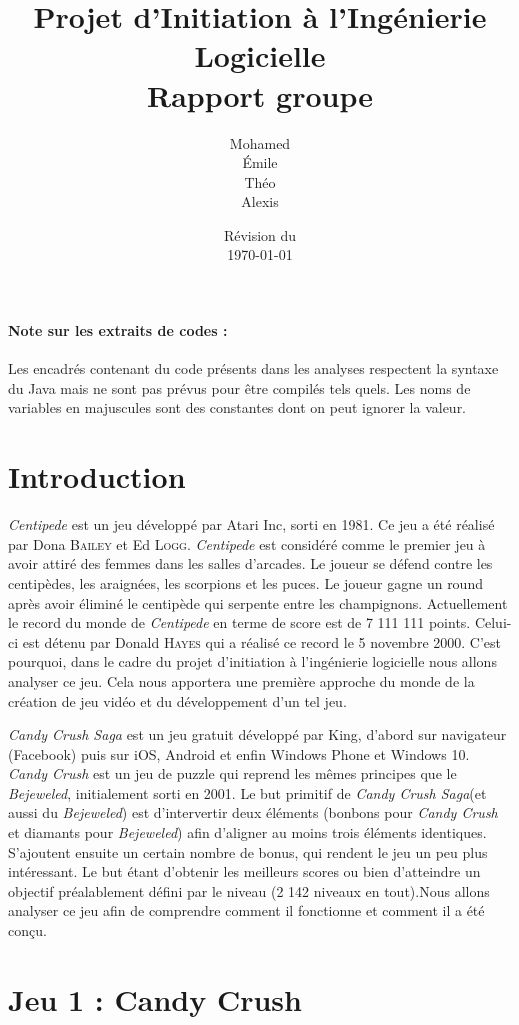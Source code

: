 \documentclass[a4paper, 12pt, oneside]{article}
\title{Projet d'Initiation à l'Ingénierie Logicielle\\Rapport groupe \no 3}
\author{Mohamed \bsc{Lakhal}\\Émile \bsc{Jeannin}\\Théo \bsc{Mottet}\\Alexis \bsc{Cabodi}}
\date{Révision du\\\today}
\newcommand{\oeuvre}[1]{\textit{#1}}
\newcommand{\Candy}{\oeuvre{Candy Crush}\xspace} %
\newcommand{\CandyS}{\oeuvre{Candy Crush Saga}\xspace}
\newcommand{\Centi}{\oeuvre{Centipede}\xspace}
\begin{document}
\maketitle
\newpage
\tableofcontents
\bigskip
\paragraph*{Note sur les extraits de codes :} Les encadrés contenant du code présents dans les analyses respectent la syntaxe du Java mais ne sont pas prévus pour être compilés tels quels. Les noms de variables en majuscules sont des constantes dont on peut ignorer la valeur.
\newpage

\section{Introduction}
\Centi est un jeu développé par Atari Inc, sorti en 1981. Ce jeu a été réalisé par Dona \textsc{Bailey} et Ed \textsc{Logg}. \Centi est considéré comme le premier jeu à avoir attiré des femmes dans les salles d'arcades. 
Le joueur se défend contre les centipèdes, les araignées, les scorpions et les puces. Le joueur gagne un round après avoir éliminé le centipède qui serpente entre les champignons. Actuellement le record du monde de \Centi en terme de score est de 7 111 111 points. Celui-ci est détenu par Donald \textsc{Hayes} qui a réalisé ce record le 5 novembre 2000. 
C'est pourquoi, dans le cadre du projet d'initiation à l'ingénierie logicielle nous allons analyser ce jeu. Cela nous apportera une première approche du monde de la création de jeu vidéo et du développement d'un tel jeu. 

\CandyS est un jeu gratuit développé par King, d'abord sur navigateur (Facebook) puis sur iOS, Android et enfin Windows Phone et Windows 10. \Candy est un jeu de puzzle qui reprend les mêmes principes que le \oeuvre{Bejeweled}, initialement sorti en 2001. Le but primitif de \CandyS (et aussi du \oeuvre{Bejeweled}) est d'intervertir deux éléments (bonbons pour \Candy et diamants pour \oeuvre{Bejeweled}) afin d'aligner au moins trois éléments identiques. S'ajoutent ensuite un certain nombre de bonus, qui rendent le jeu un peu plus intéressant. Le but étant d'obtenir les meilleurs scores ou bien d'atteindre un objectif préalablement défini par le niveau (2 142 niveaux en tout).Nous allons analyser ce jeu afin de comprendre comment il fonctionne et comment il a été conçu.

\section{Jeu 1 : Candy Crush}

\end{document}
